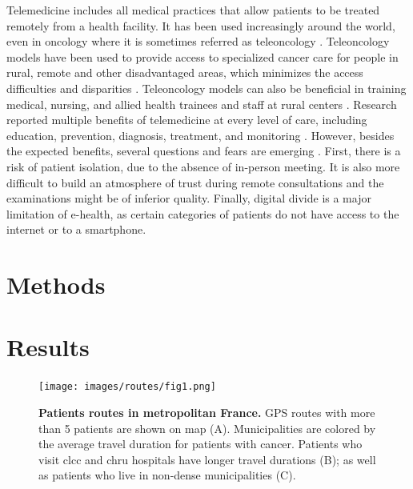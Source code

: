 Telemedicine includes all medical practices that allow patients to be treated remotely from a health facility. It has been used increasingly around the world, even in oncology where it is sometimes referred as teleoncology \cite{mooi_teleoncology_2012,sabesan_are_2014,sabesan_timely_2014,sabesan_medical_2014}. Teleoncology models have been used to provide access to specialized cancer care for people in rural, remote and other disadvantaged areas, which minimizes the access difficulties and disparities \cite{sabesan_telemedicine_2012, sabesan_are_2014}. Teleoncology models can also be beneficial in training medical, nursing, and allied health trainees and staff at rural centers \cite{sabesan_medical_2014}. Research reported multiple benefits of telemedicine at every level of care, including education, prevention, diagnosis, treatment, and monitoring \cite{bertucci_outpatient_2019}. However, besides the expected benefits, several questions and fears are emerging \cite{bertucci_outpatient_2019}. First, there is a risk of patient isolation, due to the absence of in-person meeting. It is also more difficult to build an atmosphere of trust during remote consultations and the examinations might be of inferior quality. Finally, digital divide is a major limitation of e-health, as certain categories of patients do not have access to the internet or to a smartphone.

\section{Methods}

\section{Results}

\begin{figure}[H]
    \texttt{[image: images/routes/fig1.png]}
    \centering
    \caption{
        \textbf{Patients routes in metropolitan France.} GPS routes with more than 5 patients are shown on map (A). Municipalities are colored by the average travel duration for patients with cancer. Patients who visit \ac{clcc} and \ac{chru} hospitals have longer travel durations (B); as well as patients who live in non-dense municipalities (C).
    }
    \label{fig:routes-duration-france}
\end{figure}

